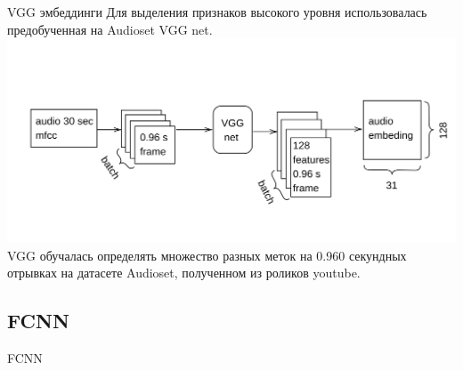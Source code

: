 \documentclass[c, aspectratio = 43]{beamer}
\begin{document}
\begin{frame}{VGG эмбеддинги}
	Для выделения признаков высокого уровня использовалась предобученная на Audioset VGG net.
	\includegraphics[width=\linewidth]{vgg_embed.png}
	VGG обучалась определять множество разных меток на 0.960 секундных отрывках на датасете Audioset, полученном из роликов youtube.
\end{frame}

 \subsection{FCNN}          
\begin{frame}{FCNN}
	
	
\end{frame}
\end{document}
